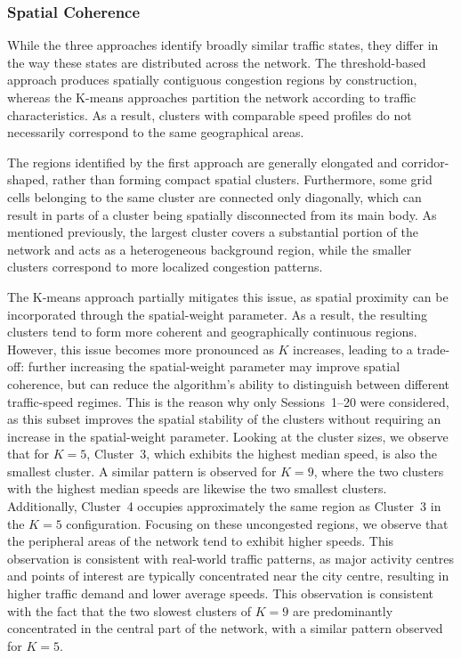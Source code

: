 \documentclass[11pt,a4paper]{article}
\begin{document}
\subsubsection{Spatial Coherence}
While the three approaches identify broadly similar traffic states, they differ in the way these states are distributed across the network. The threshold-based approach produces spatially contiguous congestion regions by construction, whereas the K-means approaches partition the network according to traffic characteristics. As a result, clusters with comparable speed profiles do not necessarily correspond to the same geographical areas.

The regions identified by the first approach are generally elongated and corridor-shaped, rather than forming compact spatial clusters. Furthermore, some grid cells belonging to the same cluster are connected only diagonally, which can result in parts of a cluster being spatially disconnected from its main body. As mentioned previously, the largest cluster covers a substantial portion of the network and acts as a heterogeneous background region, while the smaller clusters correspond to more localized congestion patterns.

The K-means approach partially mitigates this issue, as spatial proximity can be incorporated through the spatial-weight parameter. As a result, the resulting clusters tend to form more coherent and geographically continuous regions. However, this issue becomes more pronounced as $K$ increases, leading to a trade-off: further increasing the spatial-weight parameter may improve spatial coherence, but can reduce the algorithm's ability to distinguish between different traffic-speed regimes. This is the reason why only Sessions~1--20 were considered, as this subset improves the spatial stability of the clusters without requiring an increase in the spatial-weight parameter. Looking at the cluster sizes, we observe that for $K=5$, Cluster~3, which exhibits the highest median speed, is also the smallest cluster. A similar pattern is observed for $K=9$, where the two clusters with the highest median speeds are likewise the two smallest clusters. Additionally, Cluster~4 occupies approximately the same region as Cluster~3 in the $K=5$ configuration. Focusing on these uncongested regions, we observe that the peripheral areas of the network tend to exhibit higher speeds. This observation is consistent with real-world traffic patterns, as major activity centres and points of interest are typically concentrated near the city centre, resulting in higher traffic demand and lower average speeds. This observation is consistent with the fact that the two slowest clusters of $K=9$ are predominantly concentrated in the central part of the network, with a similar pattern observed for $K=5$.
\end{document}
